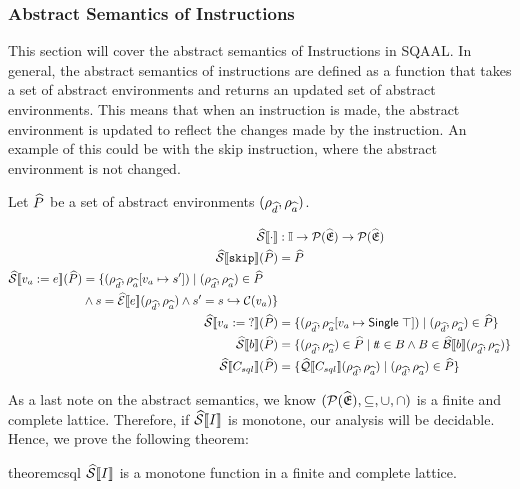 \subsubsection{Abstract Semantics of Instructions}
This section will cover the abstract semantics of Instructions in SQAAL.
In general, the abstract semantics of instructions are defined as a function that takes a set of abstract environments and returns an updated set of abstract environments.
This means that when an instruction is made, the abstract environment is updated to reflect the changes made by the instruction.
An example of this could be with the skip instruction, where the abstract environment is not changed.


Let $\widehat{P}$ be a set of abstract environments $(\rho_{\widehat{d}}, \rho_{\widehat{a}})$.

\begin{align}
    \widehat{\mathcal{S}} \llbracket \cdot \rrbracket &: \mathbb{I} \rightarrow \mathcal{P}(\widehat{\mathfrak{E}}) \rightarrow \mathcal{P}(\widehat{\mathfrak{E}}) \\
    \widehat{\mathcal{S}} \llbracket \texttt{skip} \rrbracket(\widehat{P}) &= \widehat{P} \\
    \begin{split}
        \widehat{\mathcal{S}} \llbracket v_a := e \rrbracket(\widehat{P}) &= \{(\rho_{\widehat{d}}, \rho_{\widehat{a}}[v_a \mapsto s']) \mid (\rho_{\widehat{d}}, \rho_{\widehat{a}}) \in \widehat{P} \\
        &\land s = \widehat{\mathcal{E}}\llbracket e \rrbracket(\rho_{\widehat{d}}, \rho_{\widehat{a}}) \land s' = s \hookrightarrow \mathcal{C}(v_a) \}
    \end{split}\\
    \widehat{\mathcal{S}} \llbracket v_a := \; ? \rrbracket(\widehat{P}) &= \{(\rho_{\widehat{d}}, \rho_{\widehat{a}}[v_a \mapsto \mathsf{Single} \; \top]) \mid (\rho_{\widehat{d}}, \rho_{\widehat{a}}) \in \widehat{P} \} \\
    \widehat{\mathcal{S}} \llbracket b \rrbracket(\widehat{P}) &= \{ (\rho_{\widehat{d}}, \rho_{\widehat{a}}) \in \widehat{P} \mid t\!t \in B \land B \in \widehat{\mathcal{B}}\llbracket b \rrbracket(\rho_{\widehat{d}}, \rho_{\widehat{a}}) \} \\
    \widehat{\mathcal{S}} \llbracket C_{sql} \rrbracket(\widehat{P}) &= \{\widehat{\mathcal{Q}}\llbracket C_{sql} \rrbracket(\rho_{\widehat{d}}, \rho_{\widehat{a}}) \mid (\rho_{\widehat{d}}, \rho_{\widehat{a}}) \in \widehat{P} \}
\end{align}

As a last note on the abstract semantics, we know $(\mathcal{P}(\widehat{\mathfrak{E}}), \subseteq, \cup, \cap)$ is a finite and complete lattice.
Therefore, if $\widehat{\mathcal{S}} \llbracket I \rrbracket$ is monotone, our analysis will be decidable.
Hence, we prove the following theorem:
\begin{restatable}{theorem}{csql}\label{thm:csql}
    $\widehat{\mathcal{S}} \llbracket I \rrbracket$ is a monotone function in a finite and complete lattice.
\end{restatable}

